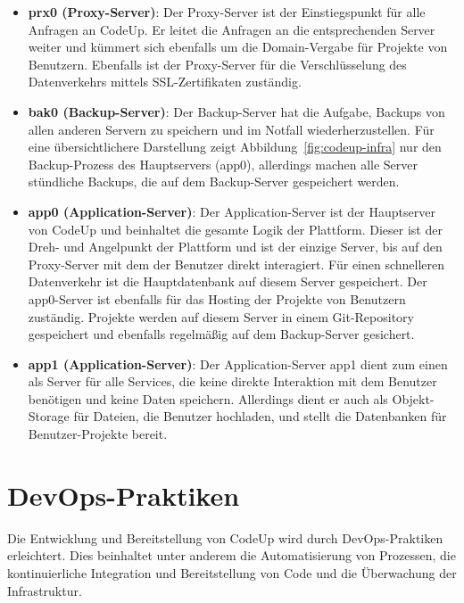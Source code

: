 \documentclass[main.tex]{subfiles}
\begin{document}
    \begin{itemize}
        \item \textbf{prx0 (Proxy-Server)}: Der Proxy-Server ist der Einstiegspunkt für alle Anfragen an CodeUp.
        Er leitet die Anfragen an die entsprechenden Server weiter und kümmert sich ebenfalls um die Domain-Vergabe für Projekte von Benutzern.
        Ebenfalls ist der Proxy-Server für die Verschlüsselung des Datenverkehrs mittels SSL-Zertifikaten zuständig.
        \item \textbf{bak0 (Backup-Server)}: Der Backup-Server hat die Aufgabe, Backups von allen anderen Servern zu speichern und im Notfall wiederherzustellen.
        Für eine übersichtlichere Darstellung zeigt Abbildung~\ref{fig:codeup-infra} nur den Backup-Prozess des Hauptservers (app0), allerdings machen alle Server stündliche Backups, die auf dem Backup-Server gespeichert werden.
        \item \textbf{app0 (Application-Server)}: Der Application-Server ist der Hauptserver von CodeUp und beinhaltet die gesamte Logik der Plattform.
        Dieser ist der Dreh- und Angelpunkt der Plattform und ist der einzige Server, bis auf den Proxy-Server mit dem der Benutzer direkt interagiert.
        Für einen schnelleren Datenverkehr ist die Hauptdatenbank auf diesem Server gespeichert.
        Der app0-Server ist ebenfalls für das Hosting der Projekte von Benutzern zuständig.
        Projekte werden auf diesem Server in einem Git-Repository gespeichert und ebenfalls regelmäßig auf dem Backup-Server gesichert.
        \item \textbf{app1 (Application-Server)}: Der Application-Server app1 dient zum einen als Server für alle Services, die keine direkte Interaktion mit dem Benutzer benötigen und keine Daten speichern.
        Allerdings dient er auch als Objekt-Storage für Dateien, die Benutzer hochladen, und stellt die Datenbanken für Benutzer-Projekte bereit.
    \end{itemize}
    \section{DevOps-Praktiken}
    Die Entwicklung und Bereitstellung von CodeUp wird durch DevOps-Praktiken erleichtert.
    Dies beinhaltet unter anderem die Automatisierung von Prozessen, die kontinuierliche Integration und Bereitstellung von Code und die Überwachung der Infrastruktur.
\end{document}
